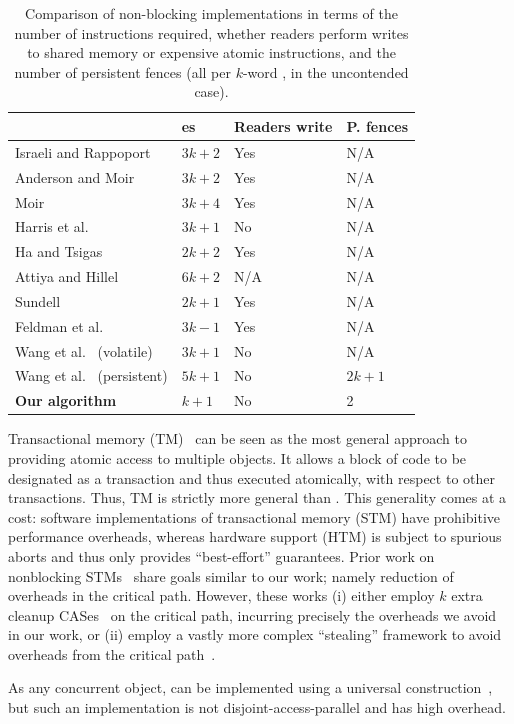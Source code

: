 \begin{table}
\centering
\caption{Comparison of non-blocking \mcas{} implementations in terms of the number of \cas{} instructions required, whether readers perform writes to shared memory or expensive atomic instructions, and the number of persistent fences (all per $k$-word \mcas{}, in the uncontended case). }
\begin{tabular}{@{}llll@{}}
  \toprule
         & \cas{}es & Readers write & P. fences \tabularnewline
  \midrule
  Israeli and Rappoport~\cite{israeli94} & $3k+2$ & Yes & N/A \tabularnewline
  Anderson and Moir~\cite{anderson95} & $3k+2$ & Yes & N/A \tabularnewline
  Moir~\cite{moir97} & $3k+4$ & Yes & N/A \tabularnewline
  Harris et al.~\cite{harris02} & $3k+1$ & No & N/A \tabularnewline
  Ha and Tsigas~\cite{ha03,ha04} & $2k+2$ & Yes & N/A \tabularnewline
  Attiya and Hillel~\cite{attiya11} & $6k+2$ & N/A & N/A \tabularnewline
  Sundell~\cite{sundell11} & $2k+1$ & Yes & N/A\tabularnewline
  Feldman et al.~\cite{feldman15} & $3k-1$ & Yes & N/A \tabularnewline
  Wang et al.~\cite{wang18} (volatile) & $3k+1$ & No & N/A \tabularnewline
  Wang et al.~\cite{wang18} (persistent) & $5k+1$ & No & $2k+1$ \tabularnewline
  \midrule\midrule
  {\bf Our algorithm} & $k+1$ & No & 2 \tabularnewline
  \bottomrule
\end{tabular}
\label{comparison}
\end{table}

Transactional memory (TM)~\cite{herlihy93a,shavit95} can be seen as the most general approach to  providing atomic access to multiple objects. It allows a block of code to be designated as a transaction and thus executed atomically, with respect to other transactions. Thus, TM is strictly more general than \mcas{}. This generality comes at a cost: software implementations of transactional memory (STM) have prohibitive performance overheads, whereas hardware support (HTM) is subject to spurious aborts and thus only provides ``best-effort'' guarantees. Prior work on nonblocking STMs~\cite{Fraser04, MaratheM08} share goals similar to our work; namely reduction of overheads in the
critical path.  However, these works (i) either employ $k$ extra cleanup CASes~\cite{Fraser04} on the critical path, incurring
precisely the overheads we avoid in our work, or (ii) employ a vastly more complex ``stealing'' framework to
avoid overheads from the critical path~\cite{MaratheM08}.

\begin{camera} 
\end{camera}\begin{arxiv}
As any concurrent object, \mcas{} can be implemented using a universal construction~\cite{herlihy93}, but such an implementation is not disjoint-access-parallel and has high overhead.
\end{arxiv}

